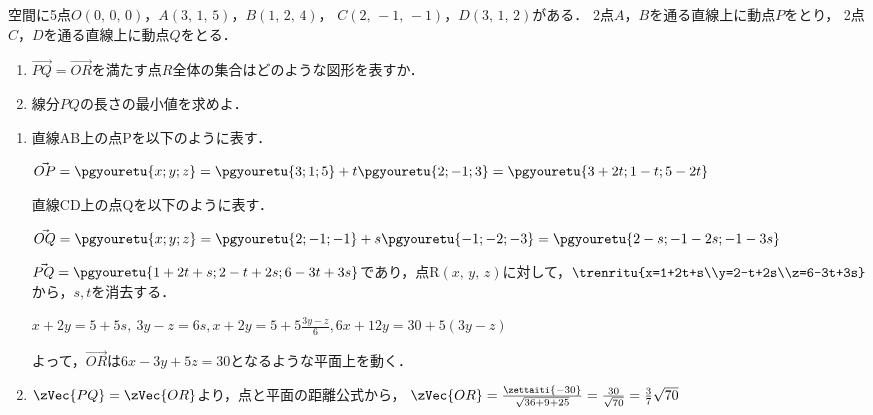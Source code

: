 \begin{problem}
  空間に5点$O(0, \, 0, \, 0)$，$A(3, \, 1, \, 5)$，$B(1, \, 2, \, 4)$，
$C(2, \, -1, \, -1)$，$D(3, \, 1, \, 2)$がある．
2点$A$，$B$を通る直線上に動点$P$をとり，
2点$C$，$D$を通る直線上に動点$Q$をとる．
\begin{enumerate}
\item $\overrightarrow{PQ}=\overrightarrow{OR}$を満たす点$R$全体の集合はどのような図形を表すか．
\item 線分$PQ$の長さの最小値を求めよ．
\end{enumerate}
\end{problem}

\begin{enumerate}
  \item 直線AB上の点Pを以下のように表す．

  $\Vec{OP} = \pgyouretu{x;y;z} = \pgyouretu{3;1;5} + t\pgyouretu{2;-1;3} = \pgyouretu{3+2t;1-t;5-2t}$

  直線CD上の点Qを以下のように表す．

  $\Vec{OQ} = \pgyouretu{x;y;z} = \pgyouretu{2;-1;-1} + s\pgyouretu{-1;-2;-3} = \pgyouretu{2-s;-1-2s;-1-3s}$

  $\Vec{PQ} = \pgyouretu{1+2t+s;2-t+2s;6-3t+3s}$であり，点R$(x,\,y,\,z)$に対して，$\trenritu{x=1+2t+s\\y=2-t+2s\\z=6-3t+3s}$から，$s,t$を消去する．

  $x+2y = 5+5s,\ 3y-z=6s, x+2y=5+5\frac{3y-z}{6}, 6x+12y=30+5(3y-z)$

  よって，$\Vec{OR}$は$6x-3y+5z=30$となるような平面上を動く．

  \item $\zVec{PQ} = \zVec{OR}$より，点と平面の距離公式から，
  $\zVec{OR} = \frac{\zettaiti{-30}}{\sqrt{36+9+25}} = \frac{30}{\sqrt{70}} = \frac37\sqrt{70}$

\end{enumerate}
